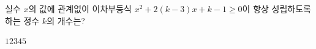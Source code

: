 실수 $x$의 값에 관계없이 이차부등식 $x^2+2(k-3)x+k-1\ge 0$이 항상 성립하도록 하는 정수 $k$의 개수는?
\begin{choices32}{$1$}{$2$}{$3$}{$4$}{$5$}\end{choices32}
